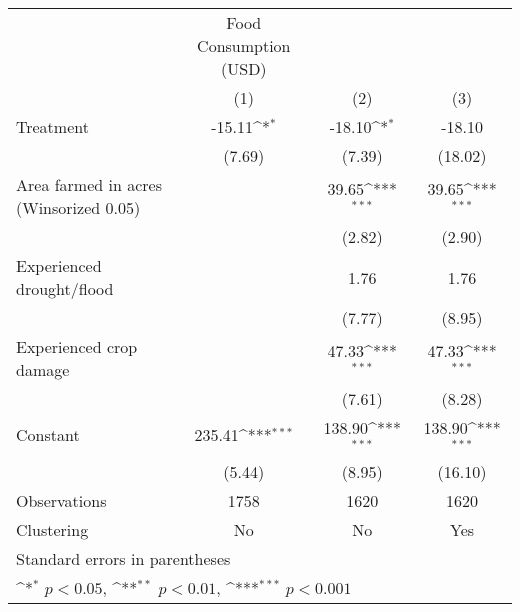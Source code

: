 {
\def\sym#1{\ifmmode^{#1}\else\(^{#1}\)\fi}
\begin{tabular}{l*{3}{c}}
\hline\hline
                    &Food Consumption (USD)                                           \\
                    &\multicolumn{1}{c}{(1)}         &\multicolumn{1}{c}{(2)}         &\multicolumn{1}{c}{(3)}         \\
\hline
Treatment           &      -15.11\sym{*}  &      -18.10\sym{*}  &      -18.10         \\
                    &      (7.69)         &      (7.39)         &     (18.02)         \\
[1em]
Area farmed in acres (Winsorized 0.05)&                     &       39.65\sym{***}&       39.65\sym{***}\\
                    &                     &      (2.82)         &      (2.90)         \\
[1em]
Experienced drought/flood&                     &        1.76         &        1.76         \\
                    &                     &      (7.77)         &      (8.95)         \\
[1em]
Experienced crop damage&                     &       47.33\sym{***}&       47.33\sym{***}\\
                    &                     &      (7.61)         &      (8.28)         \\
[1em]
Constant            &      235.41\sym{***}&      138.90\sym{***}&      138.90\sym{***}\\
                    &      (5.44)         &      (8.95)         &     (16.10)         \\
\hline
Observations        &        1758         &        1620         &        1620         \\
Clustering          &          No         &          No         &         Yes         \\
\hline\hline
\multicolumn{4}{l}{\footnotesize Standard errors in parentheses}\\
\multicolumn{4}{l}{\footnotesize \sym{*} \(p<0.05\), \sym{**} \(p<0.01\), \sym{***} \(p<0.001\)}\\
\end{tabular}
}
